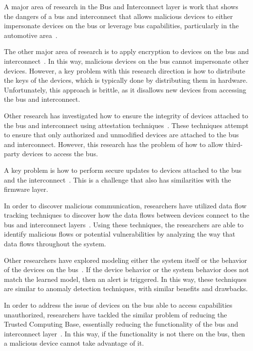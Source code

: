 \documentclass[11pt,letterpaper]{article}
\begin{document}
A major area of research in the Bus and Interconnect layer is work
that shows the dangers of a bus and interconnect that allows malicious
devices to either impersonate devices on the bus or leverage bus
capabilities, particularly in the automotive area~\cite{bonkoski2013,
  checkoway2011, hoppe2008, koscher2010, rouf2010, sang2010}.

The other major area of research is to apply encryption to devices on
the bus and interconnect~\cite{groza2012, herrewege2011, jiang2012,
  schweppe2011, stewin2014, szilagyi2010}. In this way, malicious
devices on the bus cannot impersonate other devices. However, a key
problem with this research direction is how to distribute the keys of
the devices, which is typically done by distributing them in hardware.
Unfortunately, this approach is brittle, as it disallows new devices
from accessing the bus and interconnect.

Other research has investigated how to ensure the integrity of devices
attached to the bus and interconnect using attestation
techniques~\cite{li2010, li2011}. These techniques attempt to ensure
that only authorized and unmodified devices are attached to the bus
and interconnect. However, this research has the problem of how to
allow third-party devices to access the bus.

A key problem is how to perform secure updates to devices attached to
the bus and the interconnect~\cite{larson2008}. This is a challenge
that also has similarities with the firmware layer.

In order to discover malicious communication, researchers have
utilized data flow tracking techniques to discover how the data flows
between devices connect to the bus and interconnect
layers~\cite{schweppe2012}. Using these techniques, the researchers
are able to identify malicious flows or potential vulnerabilities by
analyzing the way that data flows throughout the system.

Other researchers have explored modeling either the system itself
or the behavior of the devices on the bus~\cite{stewin2013a,
  drolia2011}. If the device behavior or the system behavior does not
match the learned model, then an alert is triggered. In this way,
these techniques are similar to anomaly detection techniques, with
similar benefits and drawbacks. 

In order to address the issue of devices on the bus able to access
capabilities unauthorized, researchers have tackled the similar
problem of reducing the Trusted Computing Base, essentially reducing
the functionality of the bus and interconnect
layer~\cite{vasudevan2012, zhang2013, zhou2009}. In this way, if the
functionality is not there on the bus, then a malicious device cannot
take advantage of it.
\end{document}
